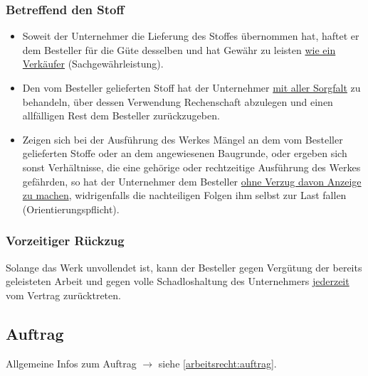 \subsubsection{Betreffend den Stoff}
\begin{itemize}
    \item Soweit der Unternehmer die Lieferung des Stoffes übernommen hat, haftet er dem Besteller für die Güte desselben und hat Gewähr zu leisten \underline{wie ein Verkäufer} (Sachgewährleistung).
    \item Den vom Besteller gelieferten Stoff hat der Unternehmer \underline{mit aller Sorgfalt} zu behandeln, über dessen Verwendung Rechenschaft abzulegen und einen allfälligen Rest dem Besteller zurückzugeben.
    \item Zeigen sich bei der Ausführung des Werkes Mängel an dem vom Besteller gelieferten Stoffe oder an dem angewiesenen Baugrunde, oder ergeben sich sonst Verhältnisse, die eine gehörige oder rechtzeitige Ausführung des Werkes gefährden, so hat der Unternehmer dem Besteller \underline{ohne Verzug davon Anzeige zu machen}, widrigenfalls die nachteiligen Folgen ihm selbst zur Last fallen (Orientierungspflicht).
\end{itemize}

\subsubsection{Vorzeitiger Rückzug}
Solange das Werk unvollendet ist, kann der Besteller gegen Vergütung der bereits geleisteten Arbeit und gegen volle Schadloshaltung des Unternehmers \underline{jederzeit} vom Vertrag zurücktreten.

\subsection{Auftrag}
Allgemeine Infos zum Auftrag $\rightarrow$ siehe \ref{arbeitsrecht:auftrag}.

